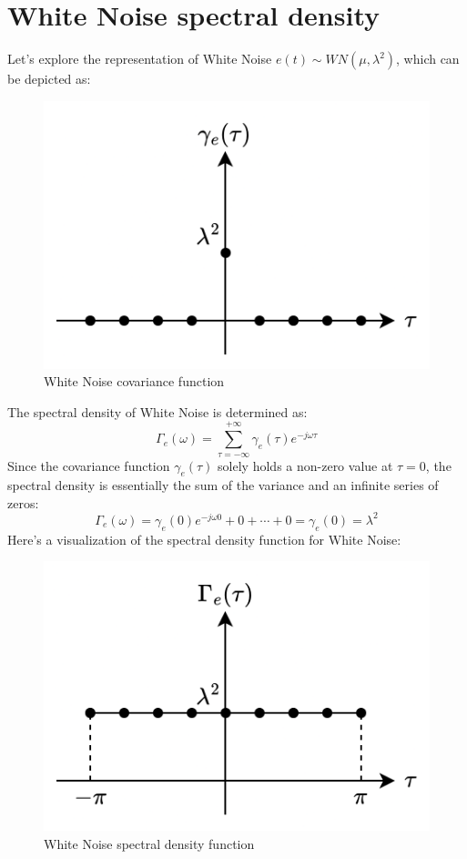 \section{ White Noise spectral density}

Let's explore the representation of  White Noise $e(t) \sim WN (\mu,\lambda^2)$, which can be depicted as:
\begin{figure}[H]
    \centering
    \includegraphics[width=0.35\linewidth]{images/wn1.png}
    \caption{ White Noise covariance function}
\end{figure}

The spectral density of  White Noise is determined as:
\[\Gamma_e(\omega)=\sum_{\tau=-\infty}^{+\infty}\gamma_e(\tau)e^{-j\omega\tau}\]
Since the covariance function $\gamma_e(\tau)$ solely holds a non-zero value at $\tau=0$, the spectral density is essentially the sum of the variance and an infinite series of zeros:
\[\Gamma_e(\omega)=\gamma_e(0)e^{-j\omega 0}+0+\cdots+0=\gamma_e(0)=\lambda^2\]
Here's a visualization of the spectral density function for  White Noise:
\begin{figure}[H]
    \centering
    \includegraphics[width=0.35\linewidth]{images/wn2.png}
    \caption{ White Noise spectral density function}
\end{figure}